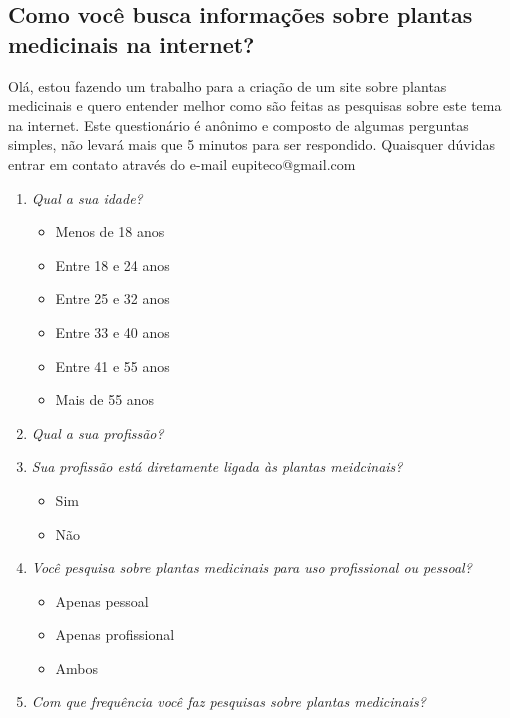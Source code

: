 \documentclass[
	12pt,				%
	a4paper,			%
	english,			%
	french,				%
	spanish,			%
	brazil,				%
	]{abntex2}
\begin{document}
\begin{anexosenv}

\partanexos

\chapter{Como você busca informações sobre plantas medicinais na internet?}\label{apa}

Olá, estou fazendo um trabalho para a criação de um site sobre plantas medicinais e quero entender melhor como são feitas as pesquisas sobre este tema na internet. Este questionário é anônimo e composto de algumas perguntas simples, não levará mais que 5 minutos para ser respondido. Quaisquer dúvidas entrar em contato através do e-mail eupiteco@gmail.com

\begin{enumerate}
\def\labelenumi{\arabic{enumi}.}
\item
  \emph{Qual a sua idade?}

  \begin{itemize}
  \tightlist
  \item
    Menos de 18 anos
  \item
    Entre 18 e 24 anos
  \item
    Entre 25 e 32 anos
  \item
    Entre 33 e 40 anos
  \item
    Entre 41 e 55 anos
  \item
    Mais de 55 anos
  \end{itemize}
\item
  \emph{Qual a sua profissão?}
\item
  \emph{Sua profissão está diretamente ligada às plantas meidcinais?}

  \begin{itemize}
  \tightlist
  \item
    Sim
  \item
    Não
  \end{itemize}
\item
  \emph{Você pesquisa sobre plantas medicinais para uso profissional ou pessoal?}

  \begin{itemize}
  \tightlist
  \item
    Apenas pessoal
  \item
    Apenas profissional
  \item
    Ambos
  \end{itemize}
\item
  \emph{Com que frequência você faz pesquisas sobre plantas medicinais?}


\end{enumerate}
\end{anexosenv}
\end{document}
